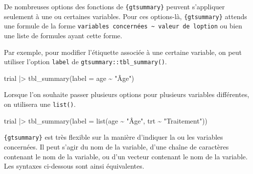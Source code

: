 \documentclass[
  letterpaper,
  DIV=11,
  numbers=noendperiod,
  oneside]{scrreprt}
\newenvironment{Shaded}{\begin{snugshade}}{\end{snugshade}}
\newcommand{\AttributeTok}[1]{\textcolor[rgb]{0.40,0.45,0.13}{#1}}
\newcommand{\FunctionTok}[1]{\textcolor[rgb]{0.28,0.35,0.67}{#1}}
\newcommand{\NormalTok}[1]{\textcolor[rgb]{0.00,0.23,0.31}{#1}}
\newcommand{\SpecialCharTok}[1]{\textcolor[rgb]{0.37,0.37,0.37}{#1}}
\newcommand{\StringTok}[1]{\textcolor[rgb]{0.13,0.47,0.30}{#1}}
\begin{document}
\begin{tcolorbox}[enhanced jigsaw, colbacktitle=quarto-callout-important-color!10!white, opacityback=0, toprule=.15mm, colback=white, coltitle=black, bottomtitle=1mm, toptitle=1mm, titlerule=0mm, rightrule=.15mm, title=\textcolor{quarto-callout-important-color}{\faExclamation}\hspace{0.5em}{Remarque sur la syntaxe des options}, breakable, bottomrule=.15mm, opacitybacktitle=0.6, arc=.35mm, left=2mm, leftrule=.75mm, colframe=quarto-callout-important-color-frame]

De nombreuses options des fonctions de \texttt{\{gtsummary\}} peuvent
s'appliquer seulement à une ou certaines variables. Pour ces options-là,
\texttt{\{gtsummary\}} attends une formule de la forme
\texttt{variables\ concernées\ \textasciitilde{}\ valeur\ de\ l\textquotesingle{}option}
ou bien une liste de formules ayant cette forme.

Par exemple, pour modifier l'étiquette associée à une certaine variable,
on peut utiliser l'option \texttt{label} de
\texttt{gtsummary::tbl\_summary()}.

\begin{Shaded}
\begin{Highlighting}[]
\NormalTok{trial }\SpecialCharTok{|\textgreater{}} 
  \FunctionTok{tbl\_summary}\NormalTok{(}\AttributeTok{label =}\NormalTok{ age }\SpecialCharTok{\textasciitilde{}} \StringTok{"Âge"}\NormalTok{)}
\end{Highlighting}
\end{Shaded}

Lorsque l'on souhaite passer plusieurs options pour plusieurs variables
différentes, on utilisera une \texttt{list()}.

\begin{Shaded}
\begin{Highlighting}[]
\NormalTok{trial }\SpecialCharTok{|\textgreater{}} 
  \FunctionTok{tbl\_summary}\NormalTok{(}\AttributeTok{label =} \FunctionTok{list}\NormalTok{(age }\SpecialCharTok{\textasciitilde{}} \StringTok{"Âge"}\NormalTok{, trt }\SpecialCharTok{\textasciitilde{}} \StringTok{"Traitement"}\NormalTok{))}
\end{Highlighting}
\end{Shaded}

\texttt{\{gtsummary\}} est très flexible sur la manière d'indiquer la ou
les variables concernées. Il peut s'agir du nom de la variable, d'une
chaîne de caractères contenant le nom de la variable, ou d'un vecteur
contenant le nom de la variable. Les syntaxes ci-dessous sont ainsi
équivalentes.


\end{tcolorbox}
\end{document}
